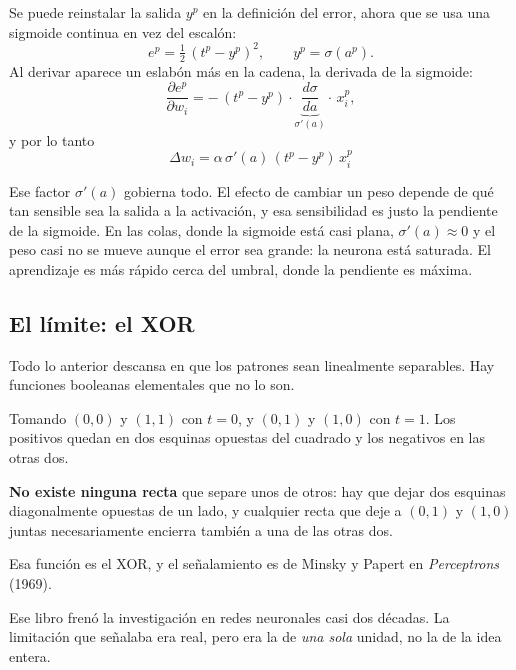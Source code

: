 \documentclass[11pt,letterpaper]{article}
\begin{document}
Se puede reinstalar la salida $y^p$ en la definición del error,
ahora que se usa una sigmoide continua en vez del escalón:
\[
    e^p = \tfrac{1}{2}\,(t^p - y^p)^2 ,
    \qquad y^p = \sigma(a^p) .
\]
Al derivar aparece un eslabón más en la cadena, la derivada de la
sigmoide:
\[
    \frac{\partial e^p}{\partial w_i}
    = -\,(t^p - y^p) \cdot
      \underbrace{\frac{d\sigma}{da}}_{\sigma'(a)} \cdot\,
      x_i^p ,
\]
y por lo tanto
\[
    \boxed{\;\Delta w_i
    = \alpha\,\sigma'(a)\,(t^p - y^p)\,x_i^p\;}
\]

\begin{idea}
  Ese factor $\sigma'(a)$ gobierna todo. El efecto de cambiar un peso
  depende de qué tan sensible sea la salida a la activación, y esa
  sensibilidad es justo la pendiente de la sigmoide. En las colas,
  donde la sigmoide está casi plana, $\sigma'(a) \approx 0$ y el peso
  casi no se mueve aunque el error sea grande: la neurona está
  saturada. El aprendizaje es más rápido cerca del umbral, donde la
  pendiente es máxima.
\end{idea}


\subsection*{El límite: el XOR}

Todo lo anterior descansa en que los patrones sean linealmente
separables. Hay funciones booleanas elementales que no lo son.

\begin{ejemplo}
  Tomando $(0,0)$ y $(1,1)$ con $t = 0$, y $(0,1)$ y $(1,0)$ con
  $t = 1$. Los positivos quedan en dos esquinas opuestas del cuadrado
  y los negativos en las otras dos.

  \textbf{No existe ninguna recta} que separe unos de otros: hay que
  dejar dos esquinas diagonalmente opuestas de un lado, y cualquier
  recta que deje a $(0,1)$ y $(1,0)$ juntas necesariamente encierra
  también a una de las otras dos.

  Esa función es el XOR, y el señalamiento es de Minsky y Papert en
  \emph{Perceptrons} (1969).
\end{ejemplo}

\begin{ojo}
  Ese libro frenó la investigación en redes neuronales casi dos
  décadas. La limitación que señalaba era real, pero era la de
  \emph{una sola} unidad, no la de la idea entera.
\end{ojo}
\end{document}
